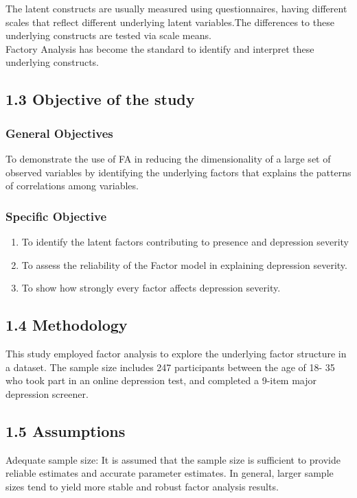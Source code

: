 \documentclass[12pt]{article}
\numberwithin{equation}{section}
\begin{document}
\noindent The latent constructs are usually measured using questionnaires, having different scales that reflect different underlying latent variables.The differences to these underlying constructs are tested via scale means.\\

\noindent Factory Analysis has become the standard to identify and interpret these underlying constructs.


\subsection* {1.3 Objective of the study}
\subsubsection*{General Objectives}
To demonstrate the use of FA in reducing the dimensionality of a large set of observed variables by identifying the underlying factors that explains the patterns of correlations among variables.

\subsubsection*{Specific Objective}
\begin{enumerate}
	\item To identify the latent factors contributing to presence and depression severity
	\item To assess the reliability of the Factor model in explaining depression severity.
	\item To show how strongly every factor affects depression severity.
\end{enumerate}

\subsection* {1.4 Methodology}
This study employed factor analysis to explore the underlying factor structure in a dataset. The sample size includes 247 participants between the age of 18- 35 who took part in an online depression test, and completed a 9-item major depression screener.

\subsection* {1.5 Assumptions}
\noindent Adequate sample size: It is assumed that the sample size is sufficient to provide reliable estimates and accurate parameter estimates. In general, larger sample sizes tend to yield more stable and robust factor analysis results.\\
\end{document}
